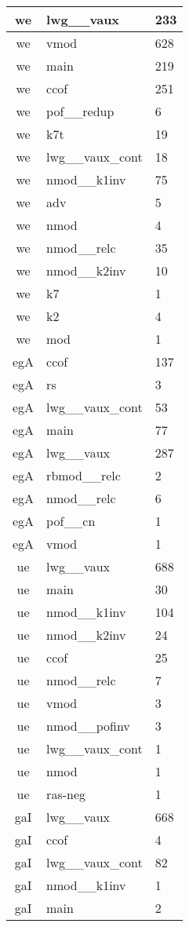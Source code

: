 \documentclass[a4 paper]{article}
\begin{document}
\begin{longtable}{cp{}p{}}
we & lwg\_\_vaux & 233\\ \midrule we & vmod & 628\\ \midrule we & main & 219\\ \midrule we & ccof & 251\\ \midrule we & pof\_\_redup & 6\\ \midrule we & k7t & 19\\ \midrule we & lwg\_\_vaux\_cont & 18\\ \midrule we & nmod\_\_k1inv & 75\\ \midrule we & adv & 5\\ \midrule we & nmod & 4\\ \midrule we & nmod\_\_relc & 35\\ \midrule we & nmod\_\_k2inv & 10\\ \midrule we & k7 & 1\\ \midrule we & k2 & 4\\ \midrule we & mod & 1\\ \midrule 
egA & ccof & 137\\ \midrule egA & rs & 3\\ \midrule egA & lwg\_\_vaux\_cont & 53\\ \midrule egA & main & 77\\ \midrule egA & lwg\_\_vaux & 287\\ \midrule egA & rbmod\_\_relc & 2\\ \midrule egA & nmod\_\_relc & 6\\ \midrule egA & pof\_\_cn & 1\\ \midrule egA & vmod & 1\\ \midrule 
ue & lwg\_\_vaux & 688\\ \midrule ue & main & 30\\ \midrule ue & nmod\_\_k1inv & 104\\ \midrule ue & nmod\_\_k2inv & 24\\ \midrule ue & ccof & 25\\ \midrule ue & nmod\_\_relc & 7\\ \midrule ue & vmod & 3\\ \midrule ue & nmod\_\_pofinv & 3\\ \midrule ue & lwg\_\_vaux\_cont & 1\\ \midrule ue & nmod & 1\\ \midrule ue & ras-neg & 1\\ \midrule 
gaI & lwg\_\_vaux & 668\\ \midrule gaI & ccof & 4\\ \midrule gaI & lwg\_\_vaux\_cont & 82\\ \midrule gaI & nmod\_\_k1inv & 1\\ \midrule gaI & main & 2\\ \midrule 

\end{longtable}
\end{document}
